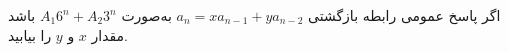     \p 
اگر پاسخ عمومی رابطه بازگشتی
$a_n = xa_{n-1} + ya_{n-2}$
به‌صورت
$A_1 6^n + A_2 3^n$
باشد مقدار
$x$
و
$y$
را بیابید.